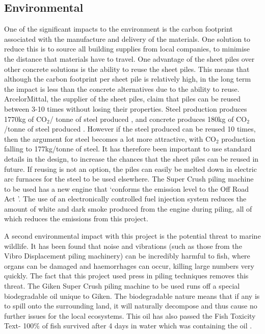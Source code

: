 \documentclass[12pt, a4paper]{article}
\begin{document}
\subsection{Environmental}
\begin{justify}
One of the significant impacts to the environment is the carbon footprint associated with the manufacture and delivery of the materials. One solution to reduce this is to source all building supplies from local companies, to minimise the distance that materials have to travel. One advantage of the sheet piles over other concrete solutions is the ability to reuse the sheet piles. This means that although the carbon footprint per sheet pile is relatively high, in the long term the impact is less than the concrete alternatives due to the ability to reuse. ArcelorMittal, the supplier of the sheet piles, claim that piles can be reused between 3-10 times without losing their properties. Steel production produces 1770kg of CO$_2$/ tonne of steel produced \cite{n}, and concrete produces 180kg of CO$_2$/tonne of steel produced \cite{o}. However if the steel produced can be reused 10 times, then the argument for steel becomes a lot more attractive, with CO$_2$ production falling to 177kg/tonne of steel. It has therefore been important to use standard details in the design, to increase the chances that the sheet piles can be reused in future. If reusing is not an option, the piles can easily be melted down in electric arc furnaces for the steel to be used elsewhere. The Super Crush piling machine to be used has a new engine that `conforms the emission level to the Off Road Act \cite{l}'. The use of an electronically controlled fuel injection system reduces the amount of white and dark smoke produced from the engine during piling, all of which reduces the emissions from this project.
\end{justify}
\begin{justify}
A second environmental impact with this project is the potential threat to marine wildlife. It has been found that noise and vibrations (such as those from the Vibro Displacement piling machinery) can be incredibly harmful to fish, where organs can be damaged and haemorrhages can occur, killing large numbers very quickly. The fact that this project used press in piling techniques removes this threat. The Giken Super Crush piling machine to be used runs off a special biodegradable oil unique to Giken. The biodegradable nature means that if any is to spill onto the surrounding land, it will naturally decompose and thus cause no further issues for the local ecosystems. This oil has also passed the Fish Toxicity Text- 100\% of fish survived after 4 days in water which was containing the oil \cite{l}.
\end{justify}
\end{document}
